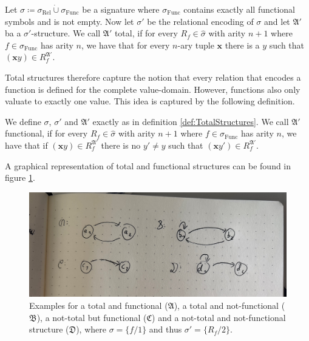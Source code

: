 \begin{definition}
	\label{def:TotalStructures}
	Let $\sigma\coloneqq \sigma_{\operatorname{Rel}} \operatorname{\dot{\cup}} \sigma_{\operatorname{Func}}$ be a signature where $\sigma_{\operatorname{Func}}$ contains exactly all functional symbols and is not empty.
	Now let $\sigma'$ be the relational encoding of $\sigma$ and let $\mathfrak A'$ ba a $\sigma'$-structure.
	We call $\mathfrak A'$ total, if for every $R_{f}\in\widehat{\sigma}$ with arity $n+1$ where $f\in \sigma_{\operatorname{Func}}$ has arity $n$, we have that for every $n$-ary tuple $\mathbf x$ there is a $y$ such that $(\mathbf xy)\in R^{\mathfrak A'}_{f}$.
\end{definition}

Total structures therefore capture the notion that every relation that encodes a function is defined for the complete value-domain.
However, functions also only valuate to exactly one value.
This idea is captured by the following definition.

\begin{definition}
	We define $\sigma$, $\sigma'$ and $\mathfrak A'$ exactly as in definition \ref{def:TotalStructures}.
	We call $\mathfrak A'$ functional, if for every $R_{f}\in\widehat{\sigma}$ with arity $n+1$ where $f\in \sigma_{\operatorname{Func}}$ has arity $n$, we have that if $(\mathbf xy)\in R^{\mathfrak A'}_{f}$ there is no $y'\neq y$ such that $(\mathbf xy')\in R^{\mathfrak A'}_{f}$.
\end{definition}

A graphical representation of total and functional structures can be found in figure \ref{fig:totalAndFunctionalStructs}.

\begin{figure}
	\includegraphics[width=\textwidth]{pictures/totalAndFunctionalStructs}
	\caption{Examples for a total and functional ($\mathfrak A$), a total and not-functional ($\mathfrak B$), a not-total but functional ($\mathfrak C$) and a not-total and not-functional structure ($\mathfrak D$), where $\sigma=\{f/1\}$ and thus $\sigma'=\{R_f/2\}$.}
	\label{fig:totalAndFunctionalStructs}
\end{figure}

